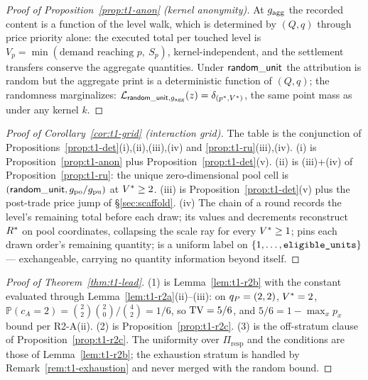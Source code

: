 
\begin{proof}[Proof of Proposition~\ref{prop:t1-anon} (kernel anonymity)]
At $g_{\mathrm{agg}}$ the recorded content is a function of the level walk, which is
determined by $(Q, q)$ through price priority alone: the executed total per
touched level is $V_p = \min(\text{demand reaching } p,\ S_p)$,
kernel-independent, and the settlement transfers conserve the aggregate
quantities. Under $\mathsf{random\_unit}$ the attribution is random but the aggregate print
is a deterministic function of $(Q, q)$; the randomness marginalizes:
$\mathcal{L}_{\mathsf{random\_unit},g_{\mathrm{agg}}}(z) = \delta_{(p^{*},V^{*})}$, the same
point mass as under any kernel $k$.
\end{proof}


\begin{proof}[Proof of Corollary~\ref{cor:t1-grid} (interaction grid)]
The table is the conjunction of
Propositions~\ref{prop:t1-det}(i),(ii),(iii),(iv) and
\ref{prop:t1-ru}(iii),(iv). (i) is Proposition~\ref{prop:t1-anon} plus
Proposition~\ref{prop:t1-det}(v). (ii) is (iii)+(iv) of
Proposition~\ref{prop:t1-ru}: the unique zero-dimensional pool cell is
$(\mathsf{random\_unit}, g_{\mathrm{po}}/g_{\mathrm{pu}})$ at $V^{*} \geq 2$. (iii) is
Proposition~\ref{prop:t1-det}(v) plus the post-trade price jump of
\S\ref{sec:scaffold}. (iv) The  chain of a round
records the level's remaining total before each draw; its values and
decrements reconstruct $R^{*}$ on pool coordinates, collapsing the scale
ray for every $V^{*} \geq 1$;  pins each drawn
order's remaining quantity;  is a uniform label on
$\{1,\dots,\fld{eligible\_units}\}$ --- exchangeable, carrying no quantity
information beyond  itself.
\end{proof}


\begin{proof}[Proof of Theorem~\ref{thm:t1-lead}]
(1) is Lemma~\ref{lem:t1-r2b} with the constant evaluated through
Lemma~\ref{lem:t1-r2a}(ii)--(iii): on $q_{P} = (2,2)$, $V^{*} = 2$,
$\mathbb{P}(c_A = 2) = \binom{2}{2}\binom{2}{0}/\binom{4}{2} = 1/6$, so
$\operatorname{TV} = 5/6$, and $5/6 = 1 - \max_x p_x$ bound per R2-A(ii). (2) is
Proposition~\ref{prop:t1-r2c}. (3) is the off-stratum clause of
Proposition~\ref{prop:t1-r2c}. The uniformity over $\Pi_{\mathrm{resp}}$
and the conditions are those of Lemma~\ref{lem:t1-r2b}; the exhaustion
stratum is handled by Remark~\ref{rem:t1-exhaustion} and never merged with
the random bound.
\end{proof}

